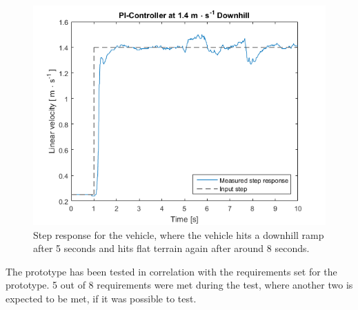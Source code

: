 \begin{figure}[H]
  \centering
	\includegraphics[scale=0.8]{figures/AccTest8D.png}
	\caption{Step response for the vehicle, where the vehicle hits a downhill ramp after 5 seconds and hits flat terrain again after around 8 seconds.}
	\label{AccT8Dfig}
\end{figure}

The prototype has been tested in correlation with the requirements set for the prototype. 5 out
of 8 requirements were met during the test, where another two is expected to be met, if it was possible to test.